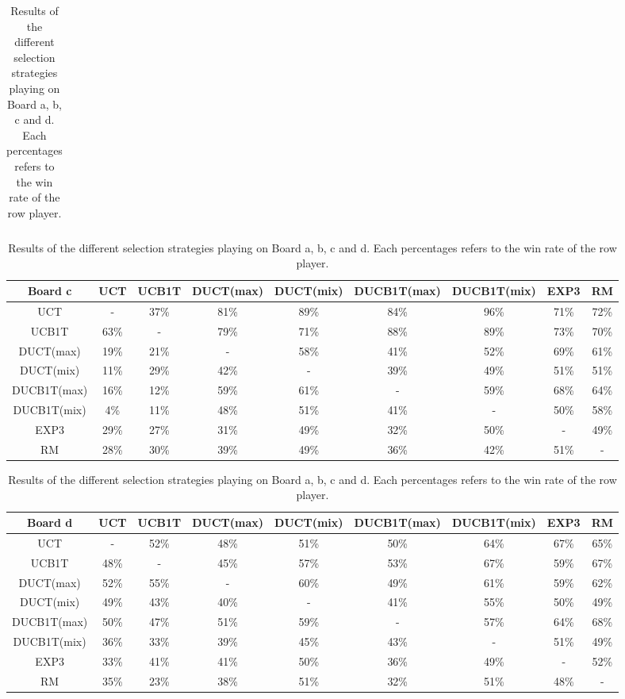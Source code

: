 \documentclass{article}
\begin{document}
\begin{table}[t]
\begin{tabular}{|c||c|c|c|c|c|c|c|c|}
\end{tabular}
\begin{tabular}{|c||c|c|c|c|c|c|c|c|}
									\hline
  Board c 		& UCT 	& UCB1T		& DUCT(max)	& DUCT(mix)	& DUCB1T(max)	& DUCB1T(mix)	& EXP3	& RM				\\ 	\hline\hline
  UCT 			&  -	& 37\% 		& 81\%		& 89\%		& 84\%		& 96\%		& 71\%	& 72\%				\\ 	\hline
  UCB1T 		& 63\% 	& - 		& 79\%		& 71\%		& 88\%		& 89\%		& 73\%	& 70\%				\\ 	\hline
  DUCT(max) 		& 19\% 	& 21\% 		& -		& 58\%		& 41\%		& 52\%		& 69\%	& 61\%				\\ 	\hline
  DUCT(mix) 		& 11\% 	& 29\% 		& 42\%		& -		& 39\%		& 49\%		& 51\%	& 51\%				\\ 	\hline
  DUCB1T(max)	 	& 16\% 	& 12\% 		& 59\%		& 61\%		& -		& 59\%		& 68\%	& 64\%				\\ 	\hline
  DUCB1T(mix)	 	& 4\%  	& 11\% 		& 48\%		& 51\%		& 41\%		& -		& 50\%	& 58\%				\\ 	\hline
  EXP3 			& 29\% 	& 27\% 		& 31\%		& 49\%		& 32\%		& 50\%		& -	& 49\%				\\ 	\hline
  RM 			& 28\% 	& 30\% 		& 39\%		& 49\%		& 36\%		& 42\%		& 51\%	& -				\\ 	\hline
\end{tabular}
\begin{tabular}{|c||c|c|c|c|c|c|c|c|}
									\hline
  Board d 		& UCT 	& UCB1T		& DUCT(max)	& DUCT(mix)	& DUCB1T(max)	& DUCB1T(mix)	& EXP3	& RM				\\ 	\hline\hline
  UCT 			&  -	& 52\%		& 48\%		& 51\%		& 50\%		& 64\%		& 67\%	& 65\%				\\ 	\hline
  UCB1T 		& 48\% 	& - 		& 45\%		& 57\%		& 53\%		& 67\%		& 59\%	& 67\%				\\ 	\hline
  DUCT(max) 		& 52\% 	& 55\% 		& -		& 60\%		& 49\%		& 61\%		& 59\%	& 62\%				\\ 	\hline
  DUCT(mix) 		& 49\% 	& 43\% 		& 40\%		& -		& 41\%		& 55\%		& 50\%	& 49\%				\\ 	\hline
  DUCB1T(max)	 	& 50\% 	& 47\% 		& 51\%		& 59\%		& -		& 57\%		& 64\%	& 68\%				\\ 	\hline
  DUCB1T(mix)	 	& 36\% 	& 33\% 		& 39\%		& 45\%		& 43\%		& -		& 51\%	& 49\%				\\ 	\hline
  EXP3 			& 33\% 	& 41\% 		& 41\%		& 50\%		& 36\%		& 49\%		& -	& 52\%				\\ 	\hline
  RM 			& 35\% 	& 23\% 		& 38\%		& 51\%		& 32\%		& 51\%		& 48\%	& -				\\ 	\hline
\end{tabular}
\caption{Results of the different selection strategies playing on Board a, b, c and d. 
Each percentages refers to the win rate of the row player. \label{table:round_robin}}
\end{table}
\end{document}
